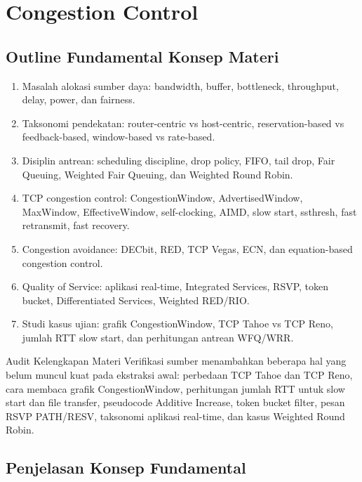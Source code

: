 \section{Congestion Control}

\subsection{Outline Fundamental Konsep Materi}

\begin{enumerate}
    \item Masalah alokasi sumber daya: bandwidth, buffer, bottleneck, throughput, delay, power, dan fairness.
    \item Taksonomi pendekatan: router-centric vs host-centric, reservation-based vs feedback-based, window-based vs rate-based.
    \item Disiplin antrean: scheduling discipline, drop policy, FIFO, tail drop, Fair Queuing, Weighted Fair Queuing, dan Weighted Round Robin.
    \item TCP congestion control: CongestionWindow, AdvertisedWindow, MaxWindow, EffectiveWindow, self-clocking, AIMD, slow start, ssthresh, fast retransmit, fast recovery.
    \item Congestion avoidance: DECbit, RED, TCP Vegas, ECN, dan equation-based congestion control.
    \item Quality of Service: aplikasi real-time, Integrated Services, RSVP, token bucket, Differentiated Services, Weighted RED/RIO.
    \item Studi kasus ujian: grafik CongestionWindow, TCP Tahoe vs TCP Reno, jumlah RTT slow start, dan perhitungan antrean WFQ/WRR.
\end{enumerate}

\begin{cmt}{Audit Kelengkapan Materi}{}
Verifikasi sumber menambahkan beberapa hal yang belum muncul kuat pada ekstraksi awal: perbedaan TCP Tahoe dan TCP Reno, cara membaca grafik CongestionWindow, perhitungan jumlah RTT untuk slow start dan file transfer, pseudocode Additive Increase, token bucket filter, pesan RSVP PATH/RESV, taksonomi aplikasi real-time, dan kasus Weighted Round Robin.
\end{cmt}

\subsection{Penjelasan Konsep Fundamental}

